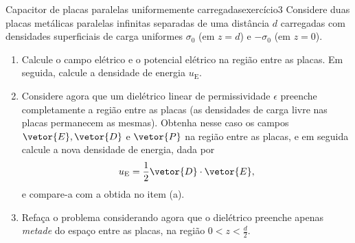 \begin{exercício}{Capacitor de placas paralelas uniformemente carregadas}{exercício3}
    Considere duas placas metálicas paralelas infinitas separadas de uma distância \(d\) carregadas com densidades superficiais de carga uniformes \(\sigma_0\) (em \(z = d\)) e \(-\sigma_0\) (em \(z = 0\)).
    \begin{enumerate}[label=(\alph*)]
        \item Calcule o campo elétrico e o potencial elétrico na região entre as placas. Em seguida, calcule a densidade de energia \(u_\mathrm{E}\).
        \item Considere agora que um dielétrico linear de permissividade \(\epsilon\) preenche completamente a região entre as placas (as densidades de carga livre nas placas permanecem as mesmas). Obtenha nesse caso os campos \(\vetor{E}, \vetor{D}\) e \(\vetor{P}\) na região entre as placas, e em seguida calcule a nova densidade de energia, dada por
            \begin{equation*}
                u_\mathrm{E} = \frac12 \vetor{D}\cdot \vetor{E},
            \end{equation*}
            e compare-a com a obtida no item (a).
        \item Refaça o problema considerando agora que o dielétrico preenche apenas \emph{metade} do espaço entre as placas, na região \(0 < z < \frac{d}2\).
    \end{enumerate}
\end{exercício}
